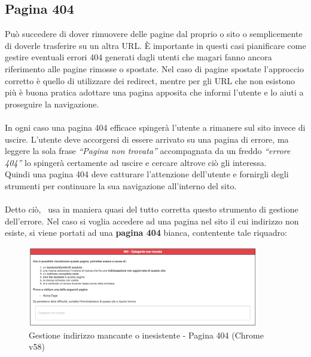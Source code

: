 \documentclass[../Relazione.tex]{subfiles}
\begin{document}
\newpage
	\subsection{Pagina 404}
		Può succedere di dover rimuovere delle pagine dal proprio o sito o semplicemente di doverle trasferire su un altra URL. È importante in questi casi pianificare come gestire eventuali errori 404 generati dagli utenti che magari fanno ancora riferimento alle pagine rimosse o spostate. Nel caso di pagine spostate l’approccio corretto è quello di utilizzare dei redirect, mentre per gli URL che non esistono più è buona pratica adottare una pagina apposita che informi l’utente e lo aiuti a proseguire la navigazione.\\\\
		In ogni caso una pagina 404 efficace spingerà l’utente a rimanere sul sito invece di uscire. L’utente deve accorgersi di essere arrivato su una pagina di errore, ma leggere la sola frase \emph{“Pagina non trovata”} accompagnata da un freddo \emph{“errore 404”} lo spingerà certamente ad uscire e cercare altrove ciò gli interessa.\\
		Quindi una pagina 404 deve catturare l’attenzione dell’utente e fornirgli degli strumenti per continuare la sua navigazione all'interno del sito.\\\\
		Detto ciò, \paint\ usa in maniera quasi del tutto corretta questo strumento di gestione dell'errore.
		Nel caso si voglia accedere ad una pagina nel sito il cui indirizzo non esiste, si viene portati ad una \textbf{pagina 404} bianca, contentente tale riquadro:

			\begin{figure}[!h]
				\centering
				\includegraphics[width=0.90\textwidth]{img/contenuto/404.png}
				\caption{Gestione indirizzo mancante o inesistente - Pagina 404 (Chrome v58)}
				\label{fig:label}
			\end{figure}
\end{document}
